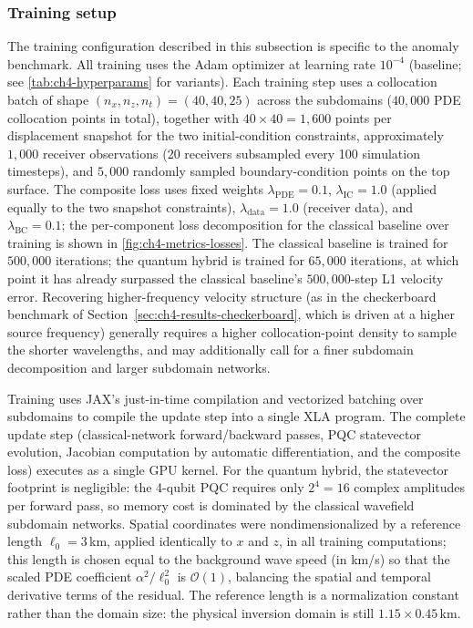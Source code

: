 \subsubsection{Training setup}
\label{sec:ch4-methods-training}

The training configuration described in this subsection is specific to the anomaly benchmark. All training uses the Adam optimizer at learning rate $10^{-4}$ (baseline; see \ref{tab:ch4-hyperparams} for variants). Each training step uses a collocation batch of shape $(n_x, n_z, n_t) = (40,40,25)$ across the subdomains ($40{,}000$ PDE collocation points in total), together with $40\!\times\!40 = 1{,}600$ points per displacement snapshot for the two initial-condition constraints, approximately $1{,}000$ receiver observations (20 receivers subsampled every 100 simulation timesteps), and $5{,}000$ randomly sampled boundary-condition points on the top surface. The composite loss uses fixed weights $\lambda_\text{PDE} = 0.1$, $\lambda_\text{IC} = 1.0$ (applied equally to the two snapshot constraints), $\lambda_\text{data} = 1.0$ (receiver data), and $\lambda_\text{BC} = 0.1$; the per-component loss decomposition for the classical baseline over training is shown in \ref{fig:ch4-metrics-losses}. The classical baseline is trained for $500{,}000$ iterations; the quantum hybrid is trained for $65{,}000$ iterations, at which point it has already surpassed the classical baseline's $500{,}000$-step L1 velocity error. Recovering higher-frequency velocity structure (as in the checkerboard benchmark of Section~\ref{sec:ch4-results-checkerboard}, which is driven at a higher source frequency) generally requires a higher collocation-point density to sample the shorter wavelengths, and may additionally call for a finer subdomain decomposition and larger subdomain networks.

Training uses JAX's just-in-time compilation and vectorized batching over subdomains to compile the update step into a single XLA program. The complete update step (classical-network forward/backward passes, PQC statevector evolution, Jacobian computation by automatic differentiation, and the composite loss) executes as a single GPU kernel. For the quantum hybrid, the statevector footprint is negligible: the 4-qubit PQC requires only $2^4 = 16$ complex amplitudes per forward pass, so memory cost is dominated by the classical wavefield subdomain networks. Spatial coordinates were nondimensionalized by a reference length $\ell_0 = 3$\,km, applied identically to $x$ and $z$, in all training computations; this length is chosen equal to the background wave speed (in km/s) so that the scaled PDE coefficient $\alpha^2/\ell_0^2$ is $\mathcal{O}(1)$, balancing the spatial and temporal derivative terms of the residual. The reference length is a normalization constant rather than the domain size: the physical inversion domain is still $1.15 \times 0.45$\,km.

